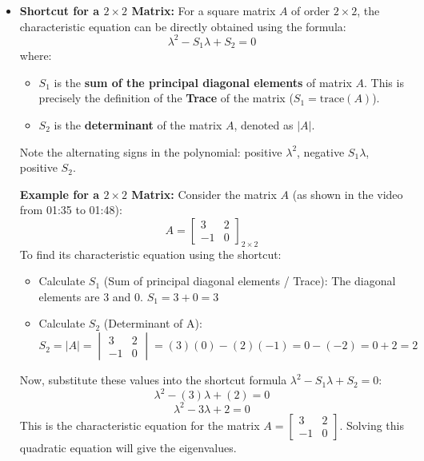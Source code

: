 \documentclass{article}
\begin{document}
\begin{itemize}
    \item \textbf{Shortcut for a $2 \times 2$ Matrix:}
    For a square matrix $A$ of order $2 \times 2$, the characteristic equation can be directly obtained using the formula:
    \[ \lambda^2 - S_1 \lambda + S_2 = 0 \]
    where:
    \begin{itemize}
        \item $S_1$ is the \textbf{sum of the principal diagonal elements} of matrix $A$. This is precisely the definition of the \textbf{Trace} of the matrix ($S_1 = \text{trace}(A)$).
        \item $S_2$ is the \textbf{determinant} of the matrix $A$, denoted as $|A|$.
    \end{itemize}
    Note the alternating signs in the polynomial: positive $\lambda^2$, negative $S_1\lambda$, positive $S_2$.

    \textbf{Example for a $2 \times 2$ Matrix:}
    Consider the matrix $A$ (as shown in the video from 01:35 to 01:48):
    \[ A = \begin{bmatrix} 3 & 2 \\ -1 & 0 \end{bmatrix}_{2 \times 2} \]
    To find its characteristic equation using the shortcut:
    \begin{itemize}
        \item Calculate $S_1$ (Sum of principal diagonal elements / Trace):
        The diagonal elements are 3 and 0.
        $S_1 = 3 + 0 = 3$
        \item Calculate $S_2$ (Determinant of A):
        $S_2 = |A| = \begin{vmatrix} 3 & 2 \\ -1 & 0 \end{vmatrix} = (3)(0) - (2)(-1) = 0 - (-2) = 0 + 2 = 2$
    \end{itemize}
    Now, substitute these values into the shortcut formula $\lambda^2 - S_1 \lambda + S_2 = 0$:
    \[ \lambda^2 - (3)\lambda + (2) = 0 \]
    \[ \lambda^2 - 3\lambda + 2 = 0 \]
    This is the characteristic equation for the matrix $A = \begin{bmatrix} 3 & 2 \\ -1 & 0 \end{bmatrix}$. Solving this quadratic equation will give the eigenvalues.


\end{itemize}
\end{document}
